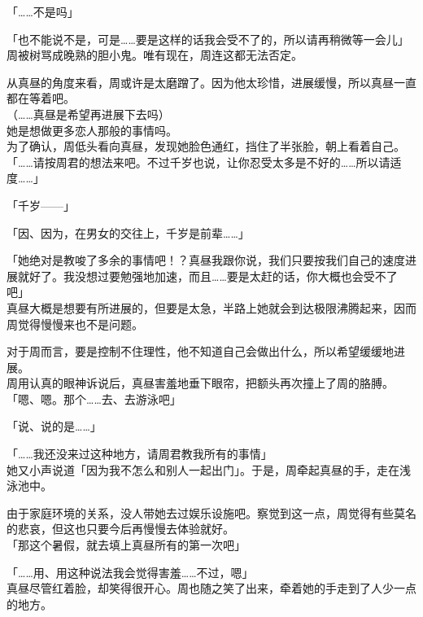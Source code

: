 「……不是吗」

「也不能说不是，可是……要是这样的话我会受不了的，所以请再稍微等一会儿」\\

周被树骂成晚熟的胆小鬼。唯有现在，周连这都无法否定。

从真昼的角度来看，周或许是太磨蹭了。因为他太珍惜，进展缓慢，所以真昼一直都在等着吧。\\

（……真昼是希望再进展下去吗）\\

她是想做更多恋人那般的事情吗。\\

为了确认，周低头看向真昼，发现她脸色通红，挡住了半张脸，朝上看着自己。\\

「……请按周君的想法来吧。不过千岁也说，让你忍受太多是不好的……所以请适度……」

「千岁——」

「因、因为，在男女的交往上，千岁是前辈……」

「她绝对是教唆了多余的事情吧！？真昼我跟你说，我们只要按我们自己的速度进展就好了。我没想过要勉强地加速，而且……要是太赶的话，你大概也会受不了吧」\\

真昼大概是想要有所进展的，但要是太急，半路上她就会到达极限沸腾起来，因而周觉得慢慢来也不是问题。

对于周而言，要是控制不住理性，他不知道自己会做出什么，所以希望缓缓地进展。\\

周用认真的眼神诉说后，真昼害羞地垂下眼帘，把额头再次撞上了周的胳膊。\\

「嗯、嗯。那个……去、去游泳吧」

「说、说的是……」

「……我还没来过这种地方，请周君教我所有的事情」\\

她又小声说道「因为我不怎么和别人一起出门」。于是，周牵起真昼的手，走在浅泳池中。

由于家庭环境的关系，没人带她去过娱乐设施吧。察觉到这一点，周觉得有些莫名的悲哀，但这也只要今后再慢慢去体验就好。\\

「那这个暑假，就去填上真昼所有的第一次吧」

「……用、用这种说法我会觉得害羞……不过，嗯」\\

真昼尽管红着脸，却笑得很开心。周也随之笑了出来，牵着她的手走到了人少一点的地方。
